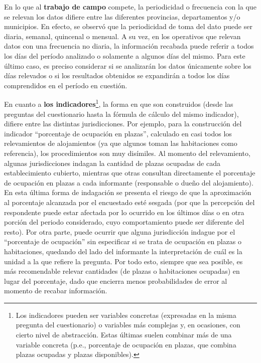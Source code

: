 \documentclass[
]{book}
\begin{document}
En lo que al \textbf{trabajo de campo} compete, la periodicidad o frecuencia con la que se relevan los datos difiere entre las diferentes provincias, departamentos y/o municipios. En efecto, se observó que la periodicidad de toma del dato puede ser diaria, semanal, quincenal o mensual. A su vez, en los operativos que relevan datos con una frecuencia no diaria, la información recabada puede referir a todos los días del período analizado o solamente a algunos días del mismo. Para este último caso, es preciso considerar si se analizarán los datos únicamente sobre los días relevados o si los resultados obtenidos se expandirán a todos los días comprendidos en el período en cuestión.

En cuanto a \textbf{los indicadores}\footnote{Los indicadores pueden ser variables concretas (expresadas en la misma pregunta del cuestionario) o variables más complejas y, en ocasiones, con cierto nivel de abstracción. Estas últimas suelen combinar más de una variable concreta (p.e., porcentaje de ocupación en plazas, que combina plazas ocupadas y plazas disponibles).}, la forma en que son construidos (desde las preguntas del cuestionario hasta la fórmula de cálculo del mismo indicador), difiere entre las distintas jurisdicciones. Por ejemplo, para la construcción del indicador ``porcentaje de ocupación en plazas'', calculado en casi todos los relevamientos de alojamientos (ya que algunos toman las habitaciones como referencia), los procedimientos son muy disímiles. Al momento del relevamiento, algunas jurisdicciones indagan la cantidad de plazas ocupadas de cada establecimiento cubierto, mientras que otras consultan directamente el porcentaje de ocupación en plazas a cada informante (responsable o dueño del alojamiento). En esta última forma de indagación se presenta el riesgo de que la aproximación al porcentaje alcanzada por el encuestado esté sesgada (por que la percepción del respondente puede estar afectada por lo ocurrido en los últimos días o en otra porción del periodo considerado, cuyo comportamiento puede ser diferente del resto). Por otra parte, puede ocurrir que alguna jurisdicción indague por el ``porcentaje de ocupación'' sin especificar si se trata de ocupación en plazas o habitaciones, quedando del lado del informante la interpretación de cuál es la unidad a la que refiere la pregunta. Por todo esto, siempre que sea posible, es más recomendable relevar cantidades (de plazas o habitaciones ocupadas) en lugar del porcentaje, dado que encierra menos probabilidades de error al momento de recabar información.
\end{document}
